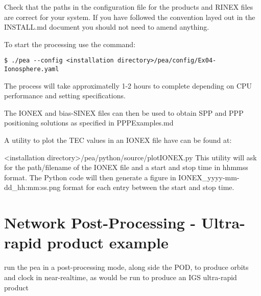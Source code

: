 Check that the paths in the configuration file for the products and RINEX files are correct for your system. 
If you have followed the convention layed out in the INSTALL.md document you should not need to amend anything.

To start the processing use the command:
\begin{lstlisting}
$ ./pea --config <installation directory>/pea/config/Ex04-Ionosphere.yaml
\end{lstlisting}

The process will take approximatelly 1-2 hours to complete depending on CPU performance and setting specifications.

The IONEX and bias-SINEX files can then be used to obtain SPP and PPP positioning solutions as specified in PPPExamples.md

A utility to plot the TEC values in an IONEX file have can be found at:

<installation directory>/pea/python/source/plotIONEX.py
This utility will ask for the path/filename of the IONEX file and a start and stop time in hhmmss format. The Python code will then generate a figure in IONEX\_yyyy-mm-dd\_hh:mm:ss.png format for each entry between the start and stop time.

\section{Network Post-Processing - Ultra-rapid product example}

 run the pea in a post-processing mode, along side the POD, to produce orbits and clock in near-realtime, as would be run to produce an IGS ultra-rapid product






